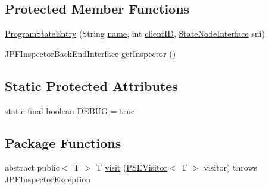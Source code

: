 \subsection*{Protected Member Functions}
\begin{DoxyCompactItemize}
\item 
\hyperlink{classgov_1_1nasa_1_1jpf_1_1inspector_1_1common_1_1pse_1_1_program_state_entry_a75018409e70590b8d1fdd61fef047275}{Program\+State\+Entry} (String \hyperlink{classgov_1_1nasa_1_1jpf_1_1inspector_1_1common_1_1pse_1_1_program_state_entry_a5fbdd37745a66317f1ea7738c3bda2a6}{name}, int \hyperlink{classgov_1_1nasa_1_1jpf_1_1inspector_1_1common_1_1pse_1_1_program_state_entry_a5743d1d799e3e1e864755f1040da1962}{client\+ID}, \hyperlink{interfacegov_1_1nasa_1_1jpf_1_1inspector_1_1server_1_1programstate_1_1_state_node_interface}{State\+Node\+Interface} sni)
\item 
\hyperlink{interfacegov_1_1nasa_1_1jpf_1_1inspector_1_1interfaces_1_1_j_p_f_inspector_back_end_interface}{J\+P\+F\+Inspector\+Back\+End\+Interface} \hyperlink{classgov_1_1nasa_1_1jpf_1_1inspector_1_1common_1_1pse_1_1_program_state_entry_ab04eadea7420b70405969a6b95656411}{get\+Inspector} ()
\end{DoxyCompactItemize}
\subsection*{Static Protected Attributes}
\begin{DoxyCompactItemize}
\item 
static final boolean \hyperlink{classgov_1_1nasa_1_1jpf_1_1inspector_1_1common_1_1pse_1_1_program_state_entry_a84ef5e9f23ec651d7a67a8ee72819b0e}{D\+E\+B\+UG} = true
\end{DoxyCompactItemize}
\subsection*{Package Functions}
\begin{DoxyCompactItemize}
\item 
abstract public$<$ T $>$ T \hyperlink{classgov_1_1nasa_1_1jpf_1_1inspector_1_1common_1_1pse_1_1_program_state_entry_a2a7282da9e128886419b853046f1fd4a}{visit} (\hyperlink{interfacegov_1_1nasa_1_1jpf_1_1inspector_1_1common_1_1pse_1_1_p_s_e_visitor}{P\+S\+E\+Visitor}$<$ T $>$ visitor)  throws J\+P\+F\+Inspector\+Exception
\end{DoxyCompactItemize}
